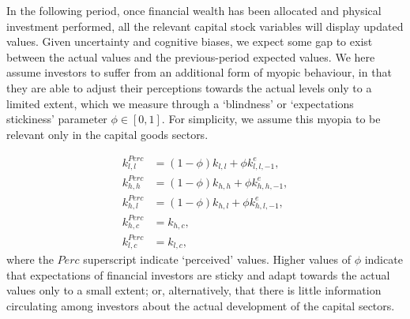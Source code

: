 \documentclass[authoryear]{article}
\begin{document}
In the following period, once financial wealth has been allocated and physical investment performed,  all the relevant capital stock variables will display updated values. Given uncertainty and cognitive biases, we expect some gap to exist between the actual values and the previous-period expected values. We here assume investors to suffer from an additional form of myopic behaviour, in that they are able to adjust their perceptions towards the actual levels only to a limited extent, which we measure through a `blindness' or `expectations stickiness' parameter $\phi\in[0,1]$. For simplicity, we assume this myopia to be relevant only in the capital goods sectors. 

\begin{align}
k_{l,l}^{Perc} &=  (1-\phi) k_{l,l} + \phi k_{l,l,-1}^e,\\
k_{h,h}^{Perc} &=  (1-\phi) k_{h,h} + \phi k_{h,h,-1}^e,\\
k_{h,l}^{Perc} &=  (1-\phi) k_{h,l} + \phi k_{h,l,-1}^e,\\
k_{h,c}^{Perc} &=  k_{h,c},\\
k_{l,c}^{Perc} &=  k_{l,c},
\end{align}
where the $Perc$ superscript indicate `perceived' values. Higher values of $\phi$ indicate that expectations of financial investors are sticky and adapt towards the actual values only to a small extent; or, alternatively, that there is little information circulating among investors about the actual development of the capital sectors. 
\end{document}
